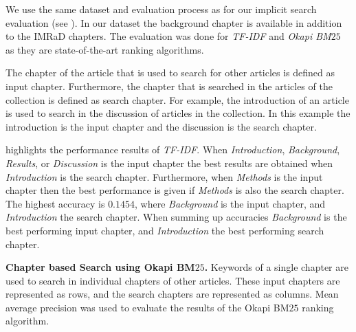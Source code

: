 We use the same dataset and evaluation process as for our implicit search evaluation (see ). In our dataset the background chapter is available in addition to the IMRaD chapters. The evaluation was done for \textit{TF-IDF} and \textit{Okapi BM$25$} as they are state-of-the-art ranking algorithms.

The chapter of the article that is used to search for other articles is defined as input chapter. Furthermore, the chapter that is searched in the articles of the collection is defined as search chapter. For example, the introduction of an article is used to search in the discussion of articles in the collection. In this example the introduction is the input chapter and the discussion is the search chapter.

 highlights the performance results of \textit{TF-IDF}. When \textit{Introduction}, \textit{Background}, \textit{Results}, or \textit{Discussion} is the input chapter the best results are obtained when \textit{Introduction} is the search chapter. Furthermore, when \textit{Methods} is the input chapter then the best performance is given if \textit{Methods} is also the search chapter. The highest accuracy is $0.1454$, where \textit{Background} is the input chapter, and \textit{Introduction} the search chapter. When summing up accuracies \textit{Background} is the best performing input chapter, and \textit{Introduction} the best performing search chapter.

\begin{table}[b!]
\vrule{}\vrule
  \caption[Chapter based Search using Okapi BM$25$]{\textbf{Chapter based Search using Okapi BM$25$.} Keywords of a single chapter are used to search in individual chapters of other articles. These input chapters are represented as rows, and the search chapters are represented as columns. Mean average precision was used to evaluate the results of the Okapi BM$25$ ranking algorithm.}
  \label{tbl:chapter_based_okapi}
\end{table}

